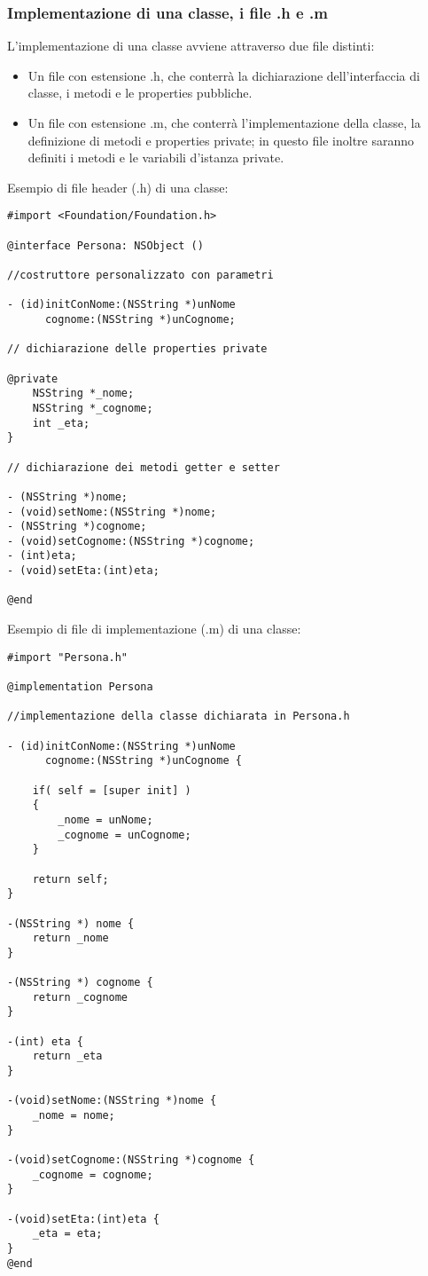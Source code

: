 \subsubsection{Implementazione di una classe, i file .h e .m}
L'implementazione di una classe avviene attraverso due file distinti:
\begin{itemize}
\item Un file con estensione .h, che conterrà la dichiarazione dell'interfaccia di classe, i metodi e le properties pubbliche.
\item Un file con estensione .m, che conterrà l'implementazione della classe, la definizione di metodi e properties private; in questo file inoltre saranno definiti i metodi e le variabili d'istanza private.
\end{itemize}
Esempio di file header (.h) di una classe:
\lstset{language=[Objective]C, breakindent=40pt, breaklines}
\begin{lstlisting}
#import <Foundation/Foundation.h>

@interface Persona: NSObject ()

//costruttore personalizzato con parametri 

- (id)initConNome:(NSString *)unNome
      cognome:(NSString *)unCognome;

// dichiarazione delle properties private 

@private
	NSString *_nome;
	NSString *_cognome;
	int _eta; 
}

// dichiarazione dei metodi getter e setter

- (NSString *)nome;
- (void)setNome:(NSString *)nome;
- (NSString *)cognome;
- (void)setCognome:(NSString *)cognome;
- (int)eta;
- (void)setEta:(int)eta;

@end
\end{lstlisting}
\bigskip
\bigskip
\bigskip
Esempio di file di implementazione (.m) di una classe:
\lstset{language=[Objective]C, breakindent=40pt, breaklines}
\begin{lstlisting}
#import "Persona.h" 

@implementation Persona

//implementazione della classe dichiarata in Persona.h

- (id)initConNome:(NSString *)unNome
      cognome:(NSString *)unCognome {
    
    if( self = [super init] )
    {
        _nome = unNome;
        _cognome = unCognome;
    }
    
    return self;
}
 
-(NSString *) nome {
	return _nome
}

-(NSString *) cognome {
	return _cognome
}

-(int) eta {
	return _eta
}

-(void)setNome:(NSString *)nome {
	_nome = nome;
}

-(void)setCognome:(NSString *)cognome {
	_cognome = cognome;
}

-(void)setEta:(int)eta {
	_eta = eta;
}
@end
\end{lstlisting}
